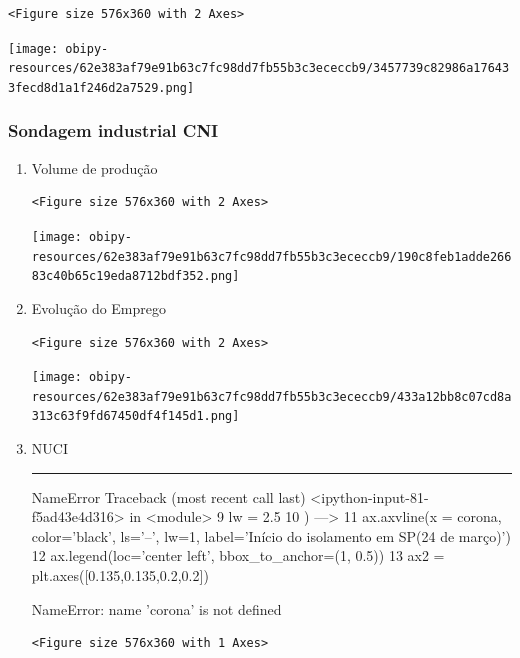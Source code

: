 \documentclass[11pt]{article}
\begin{document}
\begin{verbatim}
<Figure size 576x360 with 2 Axes>
\end{verbatim}


\begin{center}
\texttt{[image: obipy-resources/62e383af79e91b63c7fc98dd7fb55b3c3ececcb9/3457739c82986a176433fecd8d1a1f246d2a7529.png]}
\end{center}

\subsubsection{Sondagem industrial CNI}
\label{sec:org1be52cf}


\begin{enumerate}
\item Volume de produção
\label{sec:orgee94c47}

\begin{verbatim}
<Figure size 576x360 with 2 Axes>
\end{verbatim}


\begin{center}
\texttt{[image: obipy-resources/62e383af79e91b63c7fc98dd7fb55b3c3ececcb9/190c8feb1adde26683c40b65c19eda8712bdf352.png]}
\end{center}

\item Evolução do Emprego
\label{sec:org6f319ff}

\begin{verbatim}
<Figure size 576x360 with 2 Axes>
\end{verbatim}


\begin{center}
\texttt{[image: obipy-resources/62e383af79e91b63c7fc98dd7fb55b3c3ececcb9/433a12bb8c07cd8a313c63f9fd67450df4f145d1.png]}
\end{center}


\item NUCI
\label{sec:org66a4487}

\noindent\rule{\textwidth}{0.5pt}
NameError                                 Traceback (most recent call last)
<ipython-input-81-f5ad43e4d316> in <module>
      9     lw = 2.5
     10 )
---> 11 ax.axvline(x = corona, color='black', ls='--', lw=1, label='Início do isolamento em SP\n(24 de março)')
     12 ax.legend(loc='center left', bbox\_to\_anchor=(1, 0.5))
     13 ax2 = plt.axes([0.135,0.135,0.2,0.2])

NameError: name 'corona' is not defined

\begin{verbatim}
<Figure size 576x360 with 1 Axes>
\end{verbatim}



\end{enumerate}
\end{document}
